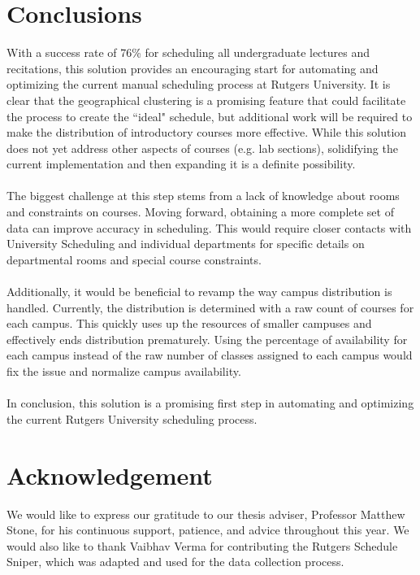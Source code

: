 \documentclass[12pt]{article}
\begin{document}
\section{Conclusions}
With a success rate of 76\% for scheduling all undergraduate lectures and recitations, this solution provides an encouraging start for automating and optimizing the current manual scheduling process at Rutgers University. It is clear that the geographical clustering is a promising feature that could facilitate the process to create the ``ideal" schedule, but additional work will be required to make the distribution of introductory courses more effective. While this solution does not yet address other aspects of courses (e.g. lab sections), solidifying the current implementation and then expanding it is a definite possibility.
\\\\
The biggest challenge at this step stems from a lack of knowledge about rooms and constraints on courses. Moving forward, obtaining a more complete set of data can improve accuracy in scheduling. This would require closer contacts with University Scheduling and individual departments for specific details on departmental rooms and special course constraints.
\\\\
Additionally, it would be beneficial to revamp the way campus distribution is handled. Currently, the distribution is determined with a raw count of courses for each campus. This quickly uses up the resources of smaller campuses and effectively ends distribution prematurely. Using the percentage of availability for each campus instead of the raw number of classes assigned to each campus would fix the issue and normalize campus availability.
\\\\
In conclusion, this solution is a promising first step in automating and optimizing the current Rutgers University scheduling process. 

\section{Acknowledgement}
We would like to express our gratitude to our thesis adviser, Professor Matthew Stone, for his continuous support, patience, and advice throughout this year. We would also like to thank Vaibhav Verma for contributing the Rutgers Schedule Sniper, which was adapted and used for the data collection process.
\end{document}
